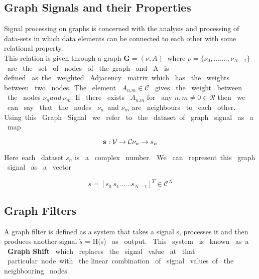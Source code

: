 \documentclass[12pt,onecolumn]{article}
\begin{document}
\subsection{{\textbf{Graph Signals and their Properties}}}
Signal processing on graphs is concerned with the analysis and processing of data-sets in which data elements can be connected to each other with some relational property.\\
This relation is given through a graph $ {\textbf{G}} = (\nu, A)\ $
\newline
where $ \nu = \{\nu_{0}, .......,\nu_{N-1} \} \ $
\ are \ the \ set \ of \ nodes \ of \ the\ graph \ and \ A \ is \\ defined \ as\ the \ weighted \ Adjacency \ matrix\ which \ has \ the \ weights \\ between \ two \ nodes.\
 The \ element \ $  A_{n.m} \in \mathcal{C} $ \ gives \ the \ weight \ between \ the \ nodes $ \nu_{n} and \ \nu_{m}. $ \newline
 If \ there \ exists \  $ A_{n.m} $ for \ any $ n,m \neq 0 \in \mathcal{R} $ then \ we \ can \ say \  that \ the \ nodes \ $ \nu_{n} $\ and $ \nu_{m}  $ are \ neighbours \ to  \ each \ other. \\
 
 Using\ this \ Graph \ Signal \ we \ refer \ to \ the \ dataset\ of \ graph \ signal \ as \ a \ map 
 

 \begin{equation*}
 \textbf{s} : \mathcal{V} \to \mathcal{C} \\
  {\nu_{n}} \to {s_{n}}
   \end{equation*}
 
 Here\ each \ dataset $ s_{n} $ is \ a \ complex \ number. \ We \ can \ represent\ this \ graph \ signal \ as \ a \ vector 
 
 \begin{equation*}
     s = [s_{0} \ s_{1} ...... s_{N-1}]^T  \in \mathcal{C}^N 
 \end{equation*}


 
\subsection{{\textbf{Graph Filters}}}
A graph filter is defined as a system that takes a  signal s, processes it and then produces another signal  $\tilde{s}$ = H(s) \ as  \ output. \ This \ system \ is \ known \ as\ a \ \textbf{Graph Shift} \ which \ replaces \ the \ signal \ value \ at \ that \ particular\ node\ with \ the linear\ combination \ of \ signal \ values\ of \ the neighbouring \ nodes.
\end{document}
